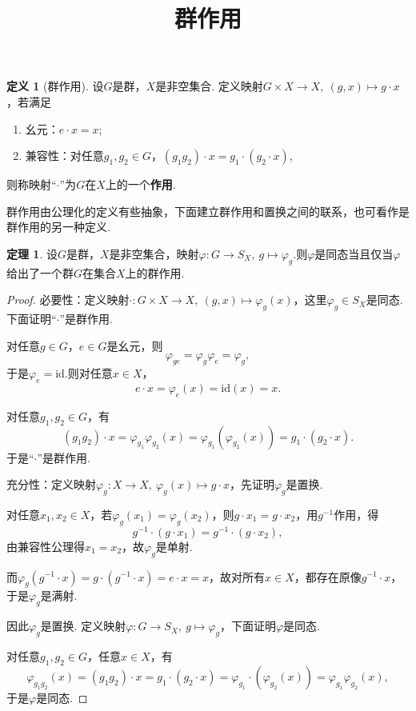 \documentclass[12pt]{ctexart}
\title{\vspace{-2em}\textbf{群作用}\vspace{-2em}}
\date{ }
\theoremstyle{definition}
\newtheorem{definition}{定义}
\newtheorem{theorem}{定理}
\theoremstyle{plain}
\newcommand{\id}{\mathrm{id}}
\begin{document}
	\maketitle
	\begin{definition}[群作用]
		设$G$是群，$X$是非空集合. 定义映射$G\times X\to X,\ (g,x)\mapsto g\cdot x$，若满足
		\begin{enumerate}
			\item 幺元：$e\cdot x=x$;
			\item 兼容性：对任意$g_1,g_2\in G$，$(g_1g_2)\cdot x=g_1\cdot(g_2\cdot x)$,
		\end{enumerate}
		则称映射“$\cdot$”为$G$在$X$上的一个\textbf{作用}.
	\end{definition}
	
	群作用由公理化的定义有些抽象，下面建立群作用和置换之间的联系，也可看作是群作用的另一种定义.
	\begin{theorem}
		设$G$是群，$X$是非空集合，映射$\varphi:G\to S_X,\ g\mapsto\varphi_{g}$.则$\varphi$是同态当且仅当$\varphi$给出了一个群$G$在集合$X$上的群作用.
	\end{theorem}
	\begin{proof}
		必要性：定义映射$\cdot:G\times X\to X,\ (g,x)\mapsto\varphi_g(x)$，这里$\varphi_g\in S_X$是同态. 下面证明“$\cdot$”是群作用.
		
		对任意$g\in G$，$e\in G$是幺元，则
		$$\varphi_{ge}=\varphi_g\varphi_e=\varphi_g,$$
		于是$\varphi_e=\id$.则对任意$x\in X$，
		$$e\cdot x=\varphi_e(x)=\id(x)=x.$$
		
		对任意$g_1,g_2\in G$，有
		$$(g_1g_2)\cdot x=\varphi_{g_1}\varphi_{g_2}(x)=\varphi_{g_1}(\varphi_{g_2}(x))=g_1\cdot(g_2\cdot x).$$
		于是“$\cdot$”是群作用.
		
		充分性：定义映射$\varphi_g:X\to X,\ \varphi_g(x)\mapsto g\cdot x$，先证明$\varphi_g$是置换.
		
		对任意$x_1,x_2\in X$，若$\varphi_g(x_1)=\varphi_g(x_2)$，则$g\cdot x_1=g\cdot x_2$，用$g^{-1}$作用，得
		$$g^{-1}\cdot(g\cdot x_1)=g^{-1}\cdot(g\cdot x_2),$$由兼容性公理得$x_1=x_2$，故$\varphi_g$是单射.
		
		而$\varphi_{g}(g^{-1}\cdot x)=g\cdot(g^{-1}\cdot x)=e\cdot x=x$，故对所有$x\in X$，都存在原像$g^{-1}\cdot x$，于是$\varphi_g$是满射.
		
		因此$\varphi_g$是置换. 定义映射$\varphi:G\to S_X,\ g\mapsto\varphi_g$，下面证明$\varphi$是同态.
		
		对任意$g_1,g_2\in G$，任意$x\in X$，有
		$$\varphi_{g_1g_2}(x)=(g_1g_2)\cdot x=g_1\cdot(g_2\cdot x)=\varphi_{g_1}\cdot(\varphi_{g_2}(x))=\varphi_{g_1}\varphi_{g_2}(x),$$
		于是$\varphi$是同态.
	\end{proof}
\end{document}
